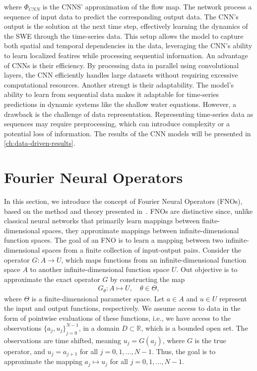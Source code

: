 where $\Phi_{CNN}$ is the CNNS' approximation of the flow map.
The network process a sequence of input data to predict the corresponding output data.
The CNN's output is the solution at the next time step, effectively learning the dynamics of the SWE through the time-series data.
This setup allows the model to capture both spatial and temporal dependencies in the data, leveraging the CNN's ability to learn localized featires while processing sequential information.
An advantage of CNNs is their efficiency.
By processing data in parallel using convolutional layers, the CNN efficiently handles large datasets without requiring excessive computational resources.
Another strengt is their adaptability. The model's ability to learn from sequential data makes it adaptable for time-series predictions in dynamic systems like the shallow water equations.
However, a drawback is the challenge of data representation.
Representing time-series data as sequences may require preprocessing, which can introduce complexity or a potential loss of information.
The results of the CNN models will be presented in \autoref{ch:data-driven-results}.

\section{Fourier Neural Operators}
In this section, we introduce the concept of Fourier Neural Operators (FNOs), based on the method and theory presented in~\cite{FNO_2021}.
FNOs are distinctive since, unlike classical neural networks that primarily learn mappings between finite-dimensional spaces, they approximate mappings between infinite-dimensional function spaces.
The goal of an FNO is to learn a mapping between two infinite-dimensional spaces from a finite collection of input-output pairs.
Consider the operator $G: A \to U$, which maps functions from an infinite-dimensional function space $A$ to another infinite-dimensional function space $U$.
Out objective is to approximate the exact operator $G$ by constructing the map
\begin{align}\label{eq:FNO_map}
    G_{\theta}: A \mapsto U, \quad \theta \in \Theta,
\end{align} 
where $\Theta$ is a finite-dimensional parameter space.
Let $a \in A$ and $u \in U$ represent the input and output functions, respectively.
We assume access to data in the form of pointwise evaluations of these functions, i.e., we have access to the observations ${\{a_j, u_j \}}_{j=0}^{N-1}$, in a domain $D \subset \mathbb{R}$, which is a bounded open set.
The observations are time shifted, meaning $u_j = G(a_j)$, where $G$ is the true operator, and $u_j = a_{j+1}$ for all $j = 0, 1, \ldots, N-1$.
Thus, the goal is to approximate the mapping $a_j \mapsto u_j$ for all $j = 0, 1, \ldots, N-1$.

